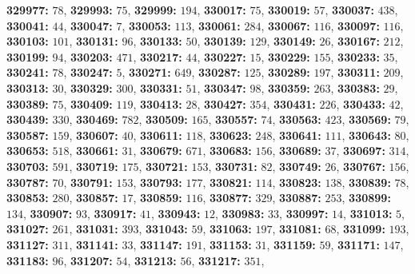 \textsf{\bfseries 329977:} $78$, \textsf{\bfseries 329993:} $75$, \textsf{\bfseries 329999:} $194$, \textsf{\bfseries 330017:} $75$, \textsf{\bfseries 330019:} $57$, \textsf{\bfseries 330037:} $438$, \textsf{\bfseries 330041:} $44$, \textsf{\bfseries 330047:} $7$, \textsf{\bfseries 330053:} $113$, \textsf{\bfseries 330061:} $284$, \textsf{\bfseries 330067:} $116$, \textsf{\bfseries 330097:} $116$, \textsf{\bfseries 330103:} $101$, \textsf{\bfseries 330131:} $96$, \textsf{\bfseries 330133:} $50$, \textsf{\bfseries 330139:} $129$, \textsf{\bfseries 330149:} $26$, \textsf{\bfseries 330167:} $212$, \textsf{\bfseries 330199:} $94$, \textsf{\bfseries 330203:} $471$, \textsf{\bfseries 330217:} $44$, \textsf{\bfseries 330227:} $15$, \textsf{\bfseries 330229:} $155$, \textsf{\bfseries 330233:} $35$, \textsf{\bfseries 330241:} $78$, \textsf{\bfseries 330247:} $5$, \textsf{\bfseries 330271:} $649$, \textsf{\bfseries 330287:} $125$, \textsf{\bfseries 330289:} $197$, \textsf{\bfseries 330311:} $209$, \textsf{\bfseries 330313:} $30$, \textsf{\bfseries 330329:} $300$, \textsf{\bfseries 330331:} $51$, \textsf{\bfseries 330347:} $98$, \textsf{\bfseries 330359:} $263$, \textsf{\bfseries 330383:} $29$, \textsf{\bfseries 330389:} $75$, \textsf{\bfseries 330409:} $119$, \textsf{\bfseries 330413:} $28$, \textsf{\bfseries 330427:} $354$, \textsf{\bfseries 330431:} $226$, \textsf{\bfseries 330433:} $42$, \textsf{\bfseries 330439:} $330$, \textsf{\bfseries 330469:} $782$, \textsf{\bfseries 330509:} $165$, \textsf{\bfseries 330557:} $74$, \textsf{\bfseries 330563:} $423$, \textsf{\bfseries 330569:} $79$, \textsf{\bfseries 330587:} $159$, \textsf{\bfseries 330607:} $40$, \textsf{\bfseries 330611:} $118$, \textsf{\bfseries 330623:} $248$, \textsf{\bfseries 330641:} $111$, \textsf{\bfseries 330643:} $80$, \textsf{\bfseries 330653:} $518$, \textsf{\bfseries 330661:} $31$, \textsf{\bfseries 330679:} $671$, \textsf{\bfseries 330683:} $156$, \textsf{\bfseries 330689:} $37$, \textsf{\bfseries 330697:} $314$, \textsf{\bfseries 330703:} $591$, \textsf{\bfseries 330719:} $175$, \textsf{\bfseries 330721:} $153$, \textsf{\bfseries 330731:} $82$, \textsf{\bfseries 330749:} $26$, \textsf{\bfseries 330767:} $156$, \textsf{\bfseries 330787:} $70$, \textsf{\bfseries 330791:} $153$, \textsf{\bfseries 330793:} $177$, \textsf{\bfseries 330821:} $114$, \textsf{\bfseries 330823:} $138$, \textsf{\bfseries 330839:} $78$, \textsf{\bfseries 330853:} $280$, \textsf{\bfseries 330857:} $17$, \textsf{\bfseries 330859:} $116$, \textsf{\bfseries 330877:} $329$, \textsf{\bfseries 330887:} $253$, \textsf{\bfseries 330899:} $134$, \textsf{\bfseries 330907:} $93$, \textsf{\bfseries 330917:} $41$, \textsf{\bfseries 330943:} $12$, \textsf{\bfseries 330983:} $33$, \textsf{\bfseries 330997:} $14$, \textsf{\bfseries 331013:} $5$, \textsf{\bfseries 331027:} $261$, \textsf{\bfseries 331031:} $393$, \textsf{\bfseries 331043:} $59$, \textsf{\bfseries 331063:} $197$, \textsf{\bfseries 331081:} $68$, \textsf{\bfseries 331099:} $193$, \textsf{\bfseries 331127:} $311$, \textsf{\bfseries 331141:} $33$, \textsf{\bfseries 331147:} $191$, \textsf{\bfseries 331153:} $31$, \textsf{\bfseries 331159:} $59$, \textsf{\bfseries 331171:} $147$, \textsf{\bfseries 331183:} $96$, \textsf{\bfseries 331207:} $54$, \textsf{\bfseries 331213:} $56$, \textsf{\bfseries 331217:} $351$, 
